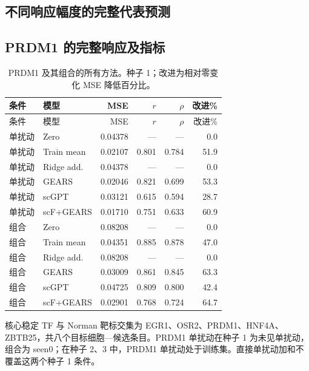 \clearpage\subsection{不同响应幅度的完整代表预测}
\clearpage\subsection{PRDM1 的完整响应及指标}
{\footnotesize\linespread{1}\selectfont\setlength{\tabcolsep}{4pt}\renewcommand{\arraystretch}{1.08}\begin{longtable}{llrrrr}\caption{PRDM1 及其组合的所有方法。种子 1；改进为相对零变化 MSE 降低百分比。}\\\toprule 条件 & 模型 & MSE & $r$ & $\rho$ & 改进\%\\\midrule\endfirsthead\toprule 条件 & 模型 & MSE & $r$ & $\rho$ & 改进\%\\\midrule\endhead
单扰动 & Zero & 0.04378 & --- & --- & 0.0\\
单扰动 & Train mean & 0.02107 & 0.801 & 0.784 & 51.9\\
单扰动 & Ridge add. & 0.04378 & --- & --- & 0.0\\
单扰动 & GEARS & 0.02046 & 0.821 & 0.699 & 53.3\\
单扰动 & scGPT & 0.03121 & 0.615 & 0.594 & 28.7\\
单扰动 & scF+GEARS & 0.01710 & 0.751 & 0.633 & 60.9\\
组合 & Zero & 0.08208 & --- & --- & 0.0\\
组合 & Train mean & 0.04351 & 0.885 & 0.878 & 47.0\\
组合 & Ridge add. & 0.08208 & --- & --- & 0.0\\
组合 & GEARS & 0.03009 & 0.861 & 0.845 & 63.3\\
组合 & scGPT & 0.04725 & 0.809 & 0.800 & 42.4\\
组合 & scF+GEARS & 0.02901 & 0.768 & 0.724 & 64.7\\
\bottomrule\end{longtable}}
核心稳定 TF 与 Norman 靶标交集为 EGR1、OSR2、PRDM1、HNF4A、ZBTB25，共八个目标细胞—候选条目。PRDM1 单扰动在种子 1 为未见单扰动，组合为 seen0；在种子 2、3 中，PRDM1 单扰动处于训练集。直接单扰动加和不覆盖这两个种子 1 条件。
